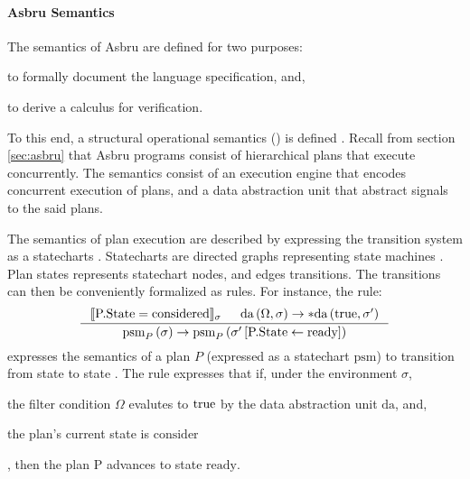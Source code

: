 \paragraph{Asbru Semantics}

The semantics of Asbru are defined for two purposes:
\begin{enumerate*}[label=(\alph*)]
  \item to formally document the language specification, and,
  \item to derive a calculus for verification.
\end{enumerate*}
To this end, a structural operational semantics (\SOS{})
is defined \cite{TuriLICS97}.
Recall from section \ref{sec:asbru} that Asbru programs
consist of hierarchical plans that execute concurrently.
The semantics consist of an execution engine that encodes
concurrent execution of plans, and a data abstraction
unit that abstract signals to the said plans.

The semantics of plan execution are described by
expressing the transition system as a statecharts \cite{DammCOMPOS97}.
Statecharts are directed graphs representing state machines \cite{BalserICIDP02}.
Plan states represents statechart nodes, and edges transitions. The transitions
can then be conveniently formalized as \SOS{} rules. For instance, the rule:
$$
\inference{\llbracket \text{P.State}=\text{considered}\rrbracket_{\sigma} &
\text{da}\left(\Omega, \sigma \right) \rightarrow \ast\text{da}\left(\true{},
\sigma^{\prime}\right)}
{\text{psm}_P\left(\sigma\right) \rightarrow
\text{psm}_P\left(\sigma^{\prime}\left[\text{P.State} \leftarrow
\text{ready}\right]\right)}
$$
expresses the semantics of a plan $P$ (expressed as a statechart $\text{psm}$)
to transition from state 
to state . The \SOS{} rule expresses that
if, under the environment $\sigma$,
\begin{enumerate*}[label=(\alph*)]
  \item the filter condition $\Omega$ evalutes to $\text{true}$ by the data
    abstraction unit $\text{da}$, and,
  \item the plan's current state is $\text{consider}$
\end{enumerate*},
then the plan $\text{P}$ advances to state $\text{ready}$.

